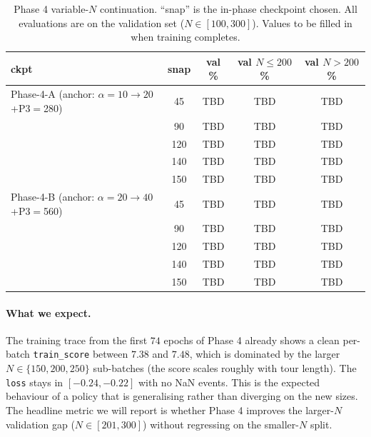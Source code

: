 \documentclass[11pt,a4paper]{article}
\begin{document}
\begin{table}[t]
\centering
\caption{Phase 4 variable-$N$ continuation. ``snap'' is the in-phase
checkpoint chosen. All evaluations are on the validation set
($N\!\in\![100,300]$). Values to be filled in when training completes.}
\label{tab:p4}
\small
\begin{tabular}{l c c c c}
\toprule
ckpt                          & snap & val \% & val $N\!\le\!200$ \% & val $N\!>\!200$ \% \\
\midrule
Phase-4-A (anchor: $\alpha\!=\!10\!\to\!20$+P3$=$280) & 45  & TBD & TBD & TBD \\
                                                     & 90  & TBD & TBD & TBD \\
                                                     & 120 & TBD & TBD & TBD \\
                                                     & 140 & TBD & TBD & TBD \\
                                                     & 150 & TBD & TBD & TBD \\
\midrule
Phase-4-B (anchor: $\alpha\!=\!20\!\to\!40$+P3$=$560) & 45  & TBD & TBD & TBD \\
                                                     & 90  & TBD & TBD & TBD \\
                                                     & 120 & TBD & TBD & TBD \\
                                                     & 140 & TBD & TBD & TBD \\
                                                     & 150 & TBD & TBD & TBD \\
\bottomrule
\end{tabular}
\end{table}

\paragraph{What we expect.} The training trace from the first $74$ epochs
of Phase 4 already shows a clean per-batch \texttt{train\_score} between
$7.38$ and $7.48$, which is dominated by the larger $N\in\{150,200,250\}$
sub-batches (the score scales roughly with tour length). The
\texttt{loss} stays in $[-0.24, -0.22]$ with no NaN events. This is the
expected behaviour of a policy that is generalising rather than
diverging on the new sizes. The headline metric we will report is whether
Phase 4 improves the larger-$N$ validation gap ($N\!\in\![201,300]$)
without regressing on the smaller-$N$ split.
\end{document}
